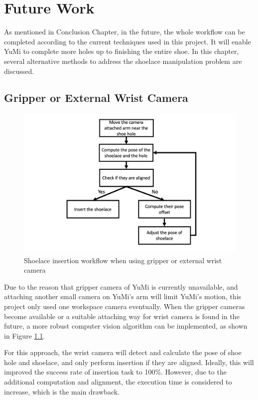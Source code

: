 \chapter{Future Work}
As mentioned in Conclusion Chapter, in the future, the whole workflow can be completed according to the current  techniques used in this project. It will enable YuMi to complete more holes up to finishing the entire shoe. In this chapter, several alternative methods to address the shoelace manipulation problem are discussed. 


\section{Gripper or External Wrist Camera} \label{futurecamera}

\begin{figure}[H]
\centering
\includegraphics[width = 0.8\columnwidth]{Futurework/feedbackcamera.png}
\caption{Shoelace insertion workflow when using gripper or external wrist camera}
\label{feedbackcamera}
\end{figure}
Due to the reason that gripper camera of YuMi is currently unavailable, and attaching another small camera on YuMi's arm will limit YuMi's motion, this project only used one workspace camera eventually. When the gripper cameras become available or a suitable attaching way for wrist camera is found in the future, a more robust computer vision algorithm can be implemented, as shown in Figure \ref{feedbackcamera}.

For this approach, the wrist camera will detect and calculate the pose of shoe hole and shoelace, and only perform insertion if they are aligned. Ideally, this will improved the success rate of insertion task to 100\%. However, due to the additional computation and alignment, the execution time is considered to increase, which is the main drawback. 

